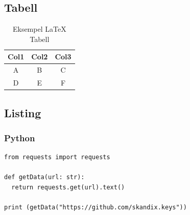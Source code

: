 \documentclass[../main-no.tex]{subfiles}
\begin{document}
\subsection{Tabell}

\begin{table}[h]
  \centering
  \begin{tabular}{| c | c | c |}
    \hline
    Col1 & Col2 & Col3 \\
    \hline
    A & B & C \\
    \hline
    D & E & F \\
    \hline
  \end{tabular}
  \caption{Eksempel LaTeX Tabell}
  \label{tab:example}
\end{table}


\subsection{Listing}

\subsubsection{Python}
\begin{listing}[!ht]
\begin{verbatim}
from requests import requests

def getData(url: str):
  return requests.get(url).text()

print (getData("https://github.com/skandix.keys"))
\end{verbatim}
\caption{Python eksempel kode for hvordan man kan bruke requests} %
\label{lst:eksempelkode} %
\end{listing}

\clearpage
\end{document}
